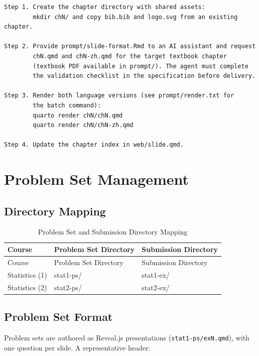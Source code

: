 \documentclass[
]{article}
\begin{document}
\begin{verbatim}
Step 1. Create the chapter directory with shared assets:
        mkdir chN/ and copy bib.bib and logo.svg from an existing chapter.

Step 2. Provide prompt/slide-format.Rmd to an AI assistant and request
        chN.qmd and chN-zh.qmd for the target textbook chapter
        (textbook PDF available in prompt/). The agent must complete
        the validation checklist in the specification before delivery.

Step 3. Render both language versions (see prompt/render.txt for
        the batch command):
        quarto render chN/chN.qmd
        quarto render chN/chN-zh.qmd

Step 4. Update the chapter index in web/slide.qmd.
\end{verbatim}

\newpage

\section{Problem Set Management}\label{problem-set-management}

\subsection{Directory Mapping}\label{directory-mapping}

\begin{longtable}[]{@{}lll@{}}
\caption{Problem Set and Submission Directory Mapping}\tabularnewline
\toprule\noalign{}
Course & Problem Set Directory & Submission Directory \\
\midrule\noalign{}
\endfirsthead
\toprule\noalign{}
Course & Problem Set Directory & Submission Directory \\
\midrule\noalign{}
\endhead
\bottomrule\noalign{}
\endlastfoot
Statistics (1) & stat1-ps/ & stat1-ex/ \\
Statistics (2) & stat2-ps/ & stat2-ex/ \\
\end{longtable}

\subsection{Problem Set Format}\label{problem-set-format}

Problem sets are authored as Reveal.js presentations
(\texttt{stat1-ps/exN.qmd}), with one question per slide. A
representative header:
\end{document}
